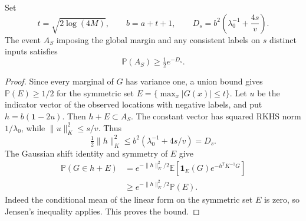\begin{lemma}
\label{lem:margin-denominator}
Set
\[
 t=\sqrt{2\log(4M)},\qquad b=a+t+1,\qquad
 D_s=b^2\left(\lambda_0^{-1}+\frac{4s}{v}\right).
\]
The event $A_S$ imposing the global margin and any consistent labels
on $s$ distinct inputs satisfies
\[
 \mathbb P(A_S)\ge\tfrac12 e^{-D_s}.
\]
\end{lemma}
\begin{proof}
Since every marginal of $G$ has variance one, a union bound gives
$\mathbb P(E)\ge1/2$ for the symmetric set
$E=\{\max_x|G(x)|\le t\}$.
Let $u$ be the indicator vector of the observed locations with
negative labels, and put $h=b(\mathbf1-2u)$.  Then $h+E\subset A_S$.
The constant vector has squared RKHS norm $1/\lambda_0$, while
$\|u\|_K^2\le s/v$.  Thus
\[
 \tfrac12\|h\|_K^2
 \le b^2(\lambda_0^{-1}+4s/v)=D_s.
\]
The Gaussian shift identity and symmetry of $E$ give
\begin{align*}
 \mathbb P(G\in h+E)
 &=e^{-\|h\|_K^2/2}
   \mathbb E[\mathbf1_E(G)e^{-h^TK^{-1}G}]\\
 &\ge e^{-\|h\|_K^2/2}\mathbb P(E).
\end{align*}
Indeed the conditional mean of the linear form on the symmetric
set $E$ is zero, so Jensen's inequality applies.  This proves
the bound.
\end{proof}


